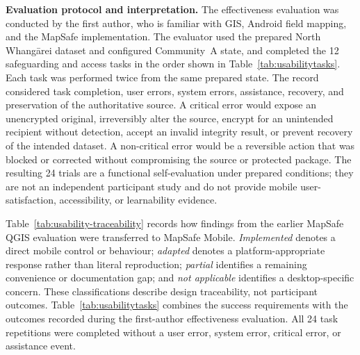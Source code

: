 \documentclass[]{interact}
\begin{document}
\noindent\textbf{Evaluation protocol and interpretation.} The effectiveness evaluation was conducted by the first author, who is familiar with GIS, Android field mapping, and the MapSafe implementation. The evaluator used the prepared North Whang\={a}rei dataset and configured Community~A state, and completed the 12 safeguarding and access tasks in the order shown in Table~\ref{tab:usabilitytasks}. Each task was performed twice from the same prepared state. The record considered task completion, user errors, system errors, assistance, recovery, and preservation of the authoritative source. A critical error would expose an unencrypted original, irreversibly alter the source, encrypt for an unintended recipient without detection, accept an invalid integrity result, or prevent recovery of the intended dataset. A non-critical error would be a reversible action that was blocked or corrected without compromising the source or protected package. The resulting 24 trials are a functional self-evaluation under prepared conditions; they are not an independent participant study and do not provide mobile user-satisfaction, accessibility, or learnability evidence.

\noindent Table~\ref{tab:usability-traceability} records how findings from the earlier MapSafe QGIS evaluation were transferred to MapSafe Mobile. \emph{Implemented} denotes a direct mobile control or behaviour; \emph{adapted} denotes a platform-appropriate response rather than literal reproduction; \emph{partial} identifies a remaining convenience or documentation gap; and \emph{not applicable} identifies a desktop-specific concern. These classifications describe design traceability, not participant outcomes. Table~\ref{tab:usabilitytasks} combines the success requirements with the outcomes recorded during the first-author effectiveness evaluation. All 24 task repetitions were completed without a user error, system error, critical error, or assistance event.
\end{document}
